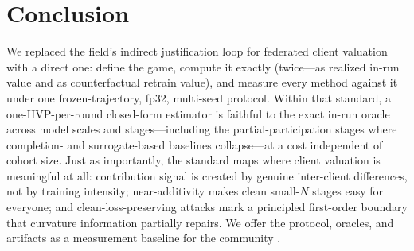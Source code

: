 \section{Conclusion}
\label{sec:conclusion}

We replaced the field's indirect justification loop for federated client
valuation with a direct one: define the game, compute it exactly (twice---as
realized in-run value and as counterfactual retrain value), and measure every
method against it under one frozen-trajectory, fp32, multi-seed protocol.
Within that standard, a one-HVP-per-round closed-form estimator is
faithful to the exact in-run oracle across model scales and stages---including
the partial-participation stages where completion- and surrogate-based
baselines collapse---at a cost independent of cohort size. Just as importantly,
the standard maps where client valuation is meaningful at all: contribution
signal is created by genuine inter-client differences, not by training
intensity; near-additivity makes clean small-$N$ stages easy for everyone; and
clean-loss-preserving attacks mark a principled first-order boundary that
curvature information partially repairs. We offer the protocol, oracles, and
artifacts as a measurement baseline for the community
.
